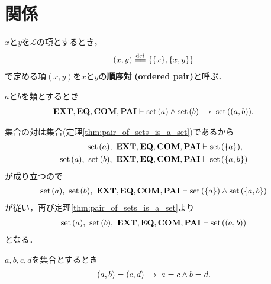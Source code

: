 \section{関係}
	\begin{screen}
		\begin{dfn}[順序対]
			$x$と$y$を$\mathcal{L}$の項とするとき，
			\begin{align}
				(x,y) \defeq \{\{x\},\{x,y\}\}
			\end{align}
			で定める項$(x,y)$を$x$と$y$の{\bf 順序対}
			{\bf (ordered pair)}と呼ぶ．
		\end{dfn}
	\end{screen}
	
	\begin{screen}
		\begin{thm}[集合の順序対は集合]
		\label{thm:ordered_pair_of_sets_is_a_set}
			$a$と$b$を類とするとき
			\begin{align}
				\EXTAX,\EQAX,\COMAX,\PAIAX \vdash
				\set{a} \wedge \set{b} \rarrow \set{(a,b)}.
			\end{align}
		\end{thm}
	\end{screen}
	
	\begin{prf}
		集合の対は集合(定理\ref{thm:pair_of_sets_is_a_set})であるから
		\begin{align}
			\set{a},\ \EXTAX,\EQAX,\COMAX,\PAIAX &\vdash \set{\{a\}}, \\
			\set{a},\ \set{b},\ \EXTAX,\EQAX,\COMAX,\PAIAX &\vdash \set{\{a,b\}}
		\end{align}
		が成り立つので
		\begin{align}
			\set{a},\ \set{b},\ \EXTAX,\EQAX,\COMAX,\PAIAX \vdash 
			\set{\{a\}} \wedge \set{\{a,b\}}
		\end{align}
		が従い，再び定理\ref{thm:pair_of_sets_is_a_set}より
		\begin{align}
			\set{a},\ \set{b},\ \EXTAX,\EQAX,\COMAX,\PAIAX \vdash \set{(a,b)}
		\end{align}
		となる．
		\QED
	\end{prf}
	
	\begin{screen}
		\begin{thm}[順序対の相等性]
		\label{thm:equality_of_ordered_pairs}
			$a,b,c,d$を集合とするとき
			\begin{align}
				(a,b) = (c,d) \rarrow a=c \wedge b=d.
			\end{align}
		\end{thm}
	\end{screen}
	
